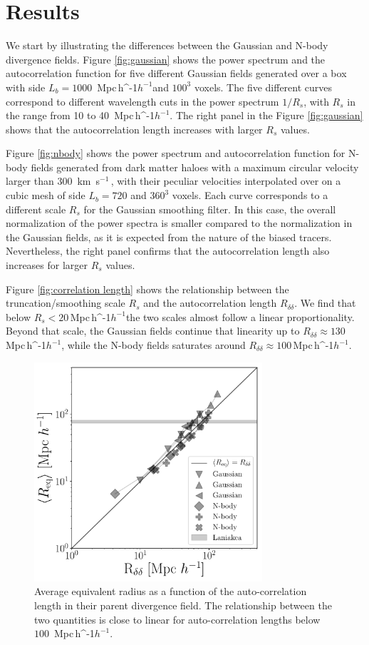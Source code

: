 \documentclass[usenatbib]{mnras}
\newcommand{\Mpch}{\,{\rm Mpc}\,\ifmmode h^{-1}\else $h^{-1}$\fi}
\newcommand{\kms}{\,{\rm km}\ s$^{-1}$\,}
\begin{document}
\section{Results}
\label{sec:results}

We start by illustrating the differences between the Gaussian and N-body divergence fields.
Figure \ref{fig:gaussian} shows the power spectrum and the autocorrelation function for five different Gaussian fields generated over a box with side $L_b=1000$ \Mpch and $100^3$ voxels.
The five different curves correspond to different wavelength cuts in the power spectrum  $1/R_s$, with $R_s$ in the range from 10 to 40 \Mpch.
The right panel in the Figure \ref{fig:gaussian} shows that the autocorrelation length increases with larger $R_{s}$ values.

Figure \ref{fig:nbody} shows the power spectrum and autocorrelation function for N-body fields generated 
from dark matter haloes with a maximum circular velocity larger than $300$ \kms, with their peculiar velocities interpolated over on a cubic mesh of side $L_b=720$ \hMpc and  $360^3$ voxels.
Each curve corresponds to a different scale $R_s$ for the Gaussian smoothing filter.
In this case, the overall normalization of the power spectra is smaller compared to the normalization in the Gaussian fields, as it is expected from the nature of the biased tracers.
Nevertheless, the right panel confirms that the autocorrelation length also increases for larger $R_{s}$ values.

Figure \ref{fig:correlation length} shows the relationship between the truncation/smoothing scale $R_s$ and the autocorrelation length $R_{\delta\delta}$.
We find that below $R_{s} < 20$\Mpch the two scales almost follow a linear proportionality.
Beyond that scale, the Gaussian fields continue that linearity up to $R_{\delta\delta}\approx 130$\Mpch, while the N-body fields saturates around $R_{\delta\delta}\approx 100$\Mpch.


\begin{figure}
    \centering
    \includegraphics[width=240pt]{summary_watershed.pdf}
    \caption{Average equivalent radius as a function of the auto-correlation length in their parent divergence field.
    The relationship between the two quantities is close to linear for auto-correlation lengths below $100$ \Mpch. \label{fig:money_plot}}
\end{figure}
\end{document}
